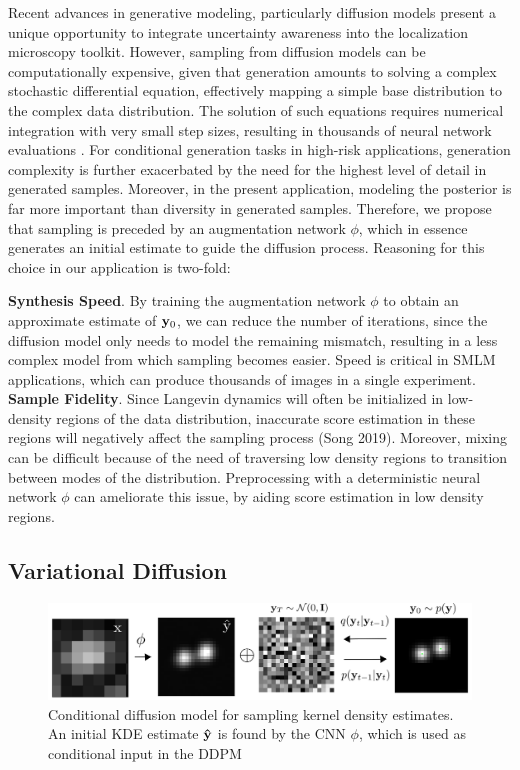 \documentclass{article}
\begin{document}
Recent advances in generative modeling, particularly diffusion models \citep{SohlDickstein2015,Ho2020,Song2021} present a unique opportunity to integrate uncertainty awareness into the localization microscopy toolkit. However, sampling from diffusion models can be computationally expensive, given that generation amounts to solving a complex stochastic differential equation, effectively mapping a simple base distribution to the complex data distribution. The solution of such equations requires numerical integration with very small step sizes, resulting in thousands of neural network evaluations \citep{Saharia2021,Vahdat2021}. For conditional generation tasks in high-risk applications, generation complexity is further exacerbated by the need for the highest level of detail in generated samples. Moreover, in the present application, modeling the posterior is far more important than diversity in generated samples. Therefore, we propose that sampling is preceded by an augmentation network $\phi$, which in essence generates an initial estimate to guide the diffusion process. Reasoning for this choice in our application is two-fold:

\textbf{Synthesis Speed}. By training the augmentation network $\phi$ to obtain an approximate estimate of $\bold{y}_{0}$, we can reduce the number of iterations, since the diffusion model only needs to model the remaining mismatch, resulting in a less complex model from which sampling becomes easier. Speed is critical in SMLM applications, which can produce thousands of images in a single experiment.\\

\textbf{Sample Fidelity}. Since Langevin dynamics will often be initialized in low-density regions of the data distribution, inaccurate score estimation in these regions will negatively affect the sampling process (Song 2019). Moreover, mixing can be difficult because of the need of traversing low density regions to transition between modes of the distribution. Preprocessing with a deterministic neural network $\phi$ can ameliorate this issue, by aiding score estimation in low density regions. 

\subsection{Variational Diffusion}

\begin{figure}
\includegraphics[scale=4.5]{media/Denoise.png}
\caption{Conditional diffusion model for sampling kernel density estimates. An initial KDE estimate $\bold{\hat{y}}$ is found by the CNN $\phi$, which is used as conditional input in the DDPM}
\end{figure}
\end{document}
